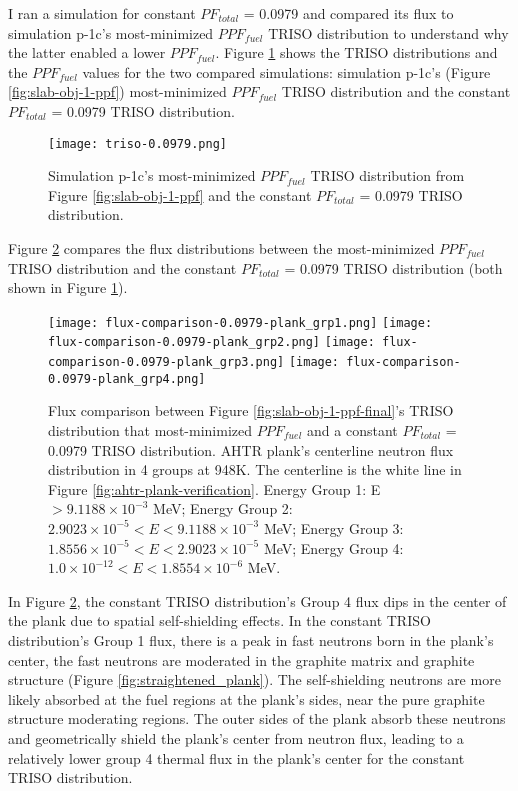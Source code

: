 I ran a simulation for constant $PF_{total}$ = 0.0979 and compared its 
flux to simulation p-1c's most-minimized $PPF_{fuel}$ TRISO distribution to understand 
why the latter enabled a lower $PPF_{fuel}$. 
Figure \ref{fig:triso-0.0979} shows the TRISO distributions and the $PPF_{fuel}$ 
values for the two compared simulations: simulation p-1c's (Figure 
\ref{fig:slab-obj-1-ppf}) most-minimized $PPF_{fuel}$ TRISO distribution and 
the constant $PF_{total}$ = 0.0979 TRISO distribution. 
\begin{figure}[htbp!]
    \centering
    \texttt{[image: triso-0.0979.png]} 
    \caption{Simulation p-1c's most-minimized $PPF_{fuel}$ TRISO distribution 
    from Figure \ref{fig:slab-obj-1-ppf} and the constant $PF_{total}$ = 0.0979 
    TRISO distribution.}
    \label{fig:triso-0.0979}
\end{figure}

Figure \ref{fig:flux-comparison-0.0979-plank} compares the flux distributions between 
the most-minimized $PPF_{fuel}$ TRISO distribution and the constant $PF_{total}$ = 0.0979 
TRISO distribution (both shown in Figure \ref{fig:triso-0.0979}).
\begin{figure}[htbp!]
    \centering
    \texttt{[image: flux-comparison-0.0979-plank\_grp1.png]} 
    \texttt{[image: flux-comparison-0.0979-plank\_grp2.png]} 
    \texttt{[image: flux-comparison-0.0979-plank\_grp3.png]} 
    \texttt{[image: flux-comparison-0.0979-plank\_grp4.png]} 
    \caption{Flux comparison between Figure \ref{fig:slab-obj-1-ppf-final}'s TRISO 
    distribution that most-minimized $PPF_{fuel}$ and a constant $PF_{total}$ = 0.0979 
    TRISO distribution. 
    \gls{AHTR} plank's centerline neutron flux distribution in 4 groups at 948K. 
    The centerline is the white line in Figure \ref{fig:ahtr-plank-verification}.
    Energy Group 1: E $> 9.1188 \times 10^{-3}$ MeV;
    Energy Group 2: $2.9023 \times 10^{-5} < E < 9.1188 \times 10^{-3}$ MeV;
    Energy Group 3:  $1.8556 \times 10^{-5} < E < 2.9023 \times 10^{-5}$ MeV;
    Energy Group 4:  $1.0 \times 10^{-12} < E < 1.8554 \times 10^{-6}$ MeV.}
    \label{fig:flux-comparison-0.0979-plank}
\end{figure}

In Figure \ref{fig:flux-comparison-0.0979-plank}, the constant TRISO distribution's 
Group 4 flux dips in the center of the plank due to spatial self-shielding effects. 
In the constant TRISO distribution's Group 1 flux, there is a peak in fast neutrons
born in the plank's center, the fast neutrons are moderated in the graphite matrix 
and graphite structure (Figure \ref{fig:straightened_plank}). 
The self-shielding neutrons are more likely absorbed at the fuel regions at the 
plank's sides, near the pure graphite structure moderating regions. 
The outer sides of the plank absorb these neutrons and geometrically shield the 
plank's center from neutron flux, leading to a relatively lower group 4 thermal 
flux in the plank's center for the constant TRISO distribution. 

